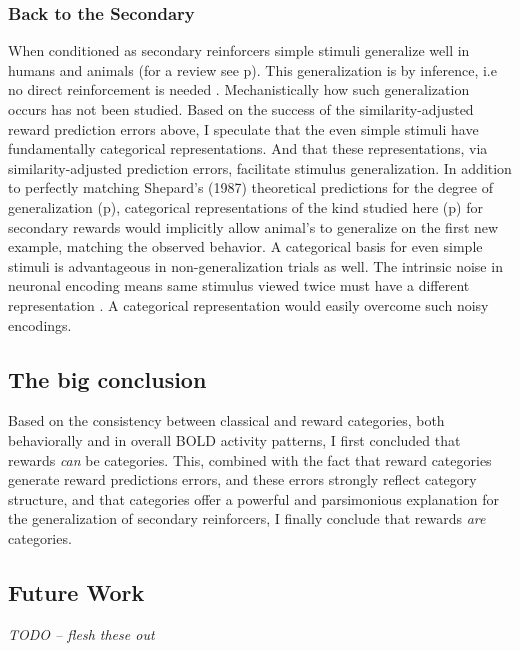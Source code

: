 \documentclass[doc,12pt]{apa}        %
\begin{document}
\subsubsection{Back to the Secondary}
\label{sub:generalsense}
When conditioned as secondary reinforcers simple stimuli generalize well in humans and animals (for a review see p\pageref{subsub:birds}).  This generalization is by inference, i.e no direct reinforcement is needed \cite{Guttman:1956p8355,Nakamura:2006p9093,Smith:2011p9101}.  Mechanistically how such generalization occurs has not been studied.  Based on the success of the similarity-adjusted reward prediction errors above, I speculate that the even simple stimuli have fundamentally categorical representations.  And that these representations, via similarity-adjusted prediction errors, facilitate stimulus generalization.  In addition to perfectly matching Shepard's (1987) theoretical predictions for the degree of generalization (p\pageref{subsub:curves}), categorical representations of the kind studied here (p\pageref{subsub:catquant}) for secondary rewards would implicitly allow animal's to generalize on the first new example, matching the observed behavior.  A categorical basis for even simple stimuli is advantageous in non-generalization trials as well. The intrinsic noise in neuronal encoding means same stimulus viewed twice must have a different representation \cite{Ashby:1986p9783}.  A categorical representation would easily overcome such noisy encodings. 

\subsection{The big conclusion}
Based on the consistency between classical and reward categories, both behaviorally and in overall BOLD activity patterns, I first concluded that rewards \emph{can} be categories.  This, combined with the fact that reward categories generate reward predictions errors, and these errors strongly reflect category structure, and that categories offer a powerful and parsimonious explanation for the generalization of secondary reinforcers, I finally conclude that rewards \emph{are} categories.


\subsection{Future Work}
\label{sub:future}

\emph{TODO -- flesh these out}
\end{document}
